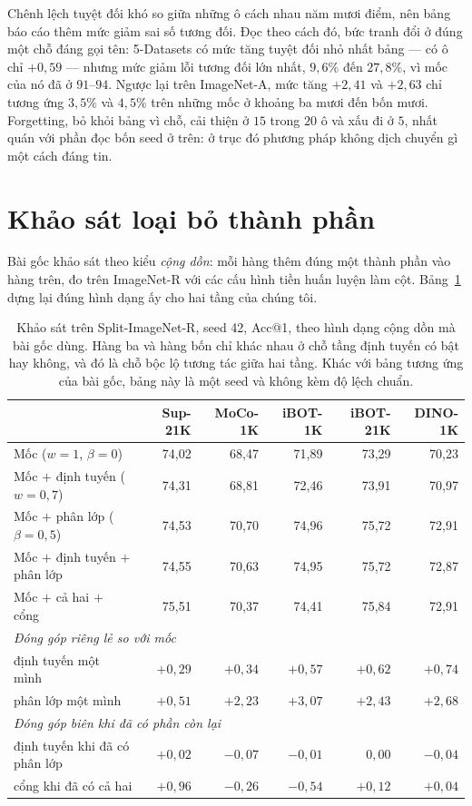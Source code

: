 \documentclass[runningheads]{llncs}
\begin{document}
Chênh lệch tuyệt đối khó so giữa những ô cách nhau năm mươi điểm, nên bảng báo
cáo thêm mức giảm sai số tương đối. Đọc theo cách đó, bức tranh đổi ở đúng một
chỗ đáng gọi tên: 5-Datasets có mức tăng tuyệt đối nhỏ nhất bảng --- có ô chỉ
$+0{,}59$ --- nhưng mức giảm lỗi tương đối lớn nhất, $9{,}6\%$ đến $27{,}8\%$, vì
mốc của nó đã ở $91$--$94$. Ngược lại trên ImageNet-A, mức tăng $+2{,}41$ và
$+2{,}63$ chỉ tương ứng $3{,}5\%$ và $4{,}5\%$ trên những mốc ở khoảng ba mươi
đến bốn mươi. Forgetting, bỏ khỏi bảng vì chỗ, cải thiện ở $15$ trong $20$ ô và
xấu đi ở $5$, nhất quán với phần đọc bốn seed ở trên: ở trục đó phương pháp không
dịch chuyển gì một cách đáng tin.

\section{Khảo sát loại bỏ thành phần}
\label{sec:ablation}

Bài gốc khảo sát theo kiểu \emph{cộng dồn}: mỗi hàng thêm đúng một thành phần vào
hàng trên, đo trên ImageNet-R với các cấu hình tiền huấn luyện làm cột.
Bảng~\ref{tab:cumul} dựng lại đúng hình dạng ấy cho hai tầng của chúng tôi.

\begin{table}
\caption{Khảo sát trên Split-ImageNet-R, seed 42, Acc@1, theo hình dạng cộng dồn
mà bài gốc dùng. Hàng ba và hàng bốn chỉ khác nhau ở chỗ tầng định tuyến có bật
hay không, và đó là chỗ bộc lộ tương tác giữa hai tầng. Khác với bảng tương ứng
của bài gốc, bảng này là một seed và không kèm độ lệch chuẩn.}\label{tab:cumul}
\begin{tabular}{lrrrrr}
\hline
& Sup-21K & MoCo-1K & iBOT-1K & iBOT-21K & DINO-1K\\
\hline
Mốc ($w=1$, $\beta=0$)                & 74,02 & 68,47 & 71,89 & 73,29 & 70,23\\
Mốc $+$ định tuyến ($w=0{,}7$)        & 74,31 & 68,81 & 72,46 & 73,91 & 70,97\\
Mốc $+$ phân lớp ($\beta=0{,}5$)      & 74,53 & 70,70 & 74,96 & 75,72 & 72,91\\
Mốc $+$ định tuyến $+$ phân lớp       & 74,55 & 70,63 & 74,95 & 75,72 & 72,87\\
Mốc $+$ cả hai $+$ cổng               & 75,51 & 70,37 & 74,41 & 75,84 & 72,91\\
\hline
\multicolumn{6}{l}{\emph{Đóng góp riêng lẻ so với mốc}}\\
định tuyến một mình & $+0{,}29$ & $+0{,}34$ & $+0{,}57$ & $+0{,}62$ & $+0{,}74$\\
phân lớp một mình   & $+0{,}51$ & $+2{,}23$ & $+3{,}07$ & $+2{,}43$ & $+2{,}68$\\
\multicolumn{6}{l}{\emph{Đóng góp biên khi đã có phần còn lại}}\\
định tuyến khi đã có phân lớp & $+0{,}02$ & $-0{,}07$ & $-0{,}01$ & $0{,}00$ & $-0{,}04$\\
cổng khi đã có cả hai         & $+0{,}96$ & $-0{,}26$ & $-0{,}54$ & $+0{,}12$ & $+0{,}04$\\
\hline
\end{tabular}
\end{table}
\end{document}
